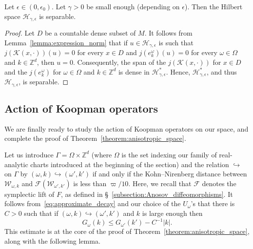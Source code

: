 \documentclass[AHL,Unicode,longabstracts,published]{cedram}
\newcommand{\p}[1]{\left(#1\right)}
\newcommand{\va}[1]{\left|#1\right|}
\newcommand{\clH}{\mathcal{H}}
\newcommand{\clF}{\mathcal{F}}
\newcommand{\clW}{\mathcal{W}}
\newcommand{\clK}{\mathcal{K}}
\newcommand{\bbZ}{\mathbb{Z}}
\begin{document}
\begin{lemm}\label{lemma:separability}
Let $\epsilon \in (0,\epsilon_0)$. Let $\gamma > 0$ be small enough (depending on $\epsilon$). Then the Hilbert space $\clH_{\gamma,\epsilon}$ is separable.
\end{lemm}

\begin{proof}
Let $D$ be a countable dense subset of $M$. It follows from Lemma~\ref{lemma:expression_norm} that if $u \in \clH_{\gamma,\epsilon}$ is such that $j(\clK (x,\cdot))(u) = 0$ for every $x \in D$ and $j(e_k^\omega)(u)=0$ for every $\omega \in \Omega$ and $k \in \bbZ^d$, then $u = 0$. Consequently, the span of the $j(\clK (x,\cdot))$ for $x \in D$ and the $j(e_k^\omega)$ for $\omega \in \Omega$ and $k \in \bbZ^d$ is dense in $\clH_{\gamma,\epsilon}^*$. Hence, $\clH_{\gamma,\epsilon}^*$, and thus $\clH_{\gamma,\epsilon}$, is separable.
\end{proof}

\subsection{Action of Koopman operators}

We are finally ready to study the action of Koopman operators on our space, and complete the proof of Theorem~\ref{theorem:anisotropic_space}.

Let us introduce $\Gamma = \Omega \times \bbZ^d$ (where $\Omega$ is the set indexing our family of real-analytic charts introduced at the beginning of the section) and the relation $\hookrightarrow$ on $\Gamma$ by $(\omega,k) \hookrightarrow (\omega',k')$ if and only if the Kohn--Nirenberg distance between $\clW_{\omega,k}$ and $\clF\p{\clW_{\omega',k'}}$ is less than $\varpi/10$. Here, we recall that $\clF$ denotes the symplectic lift of $F$, as defined in \S~\ref{subsection:Anosov_diffeomorphisms}. It follows from~\eqref{eq:approximate_decay} and our choice of the $U_\omega$'s that there is $C > 0$ such that if $(\omega,k) \hookrightarrow (\omega',k')$ and $k$ is large enough then
\begin{equation}\label{eq:decay_escape}
G_{\omega}(k) \leq G_{\omega'}(k') - C^{-1} \va{k}.
\end{equation}
This estimate is at the core of the proof of Theorem~\ref{theorem:anisotropic_space}, along with the following lemma.
\end{document}
